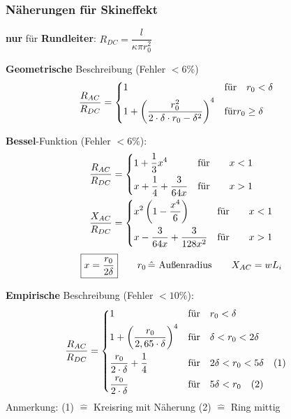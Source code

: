 \subsubsection{Näherungen für Skineffekt}
\textbf{nur} für \textbf{Rundleiter}: $ R_{DC} = \dfrac{l}{\kappa \pi r_0^2}$
\begin{description}
	\item \textbf{Geometrische} Beschreibung (Fehler $ < 6\% $)
	  	\begin{align*}
		\frac{R_{AC}}{R_{DC}} & =
		\begin{dcases}
			1 & \text{für} \quad r_0 < \delta \\
			1+ \left( \frac{r_0^2}{2\cdot \delta \cdot r_0 - \delta^2} \right)^4  & \text{für} r_0 \geq \delta
		\end{dcases}
	\end{align*}
	
    \item \textbf{Bessel}-Funktion (Fehler $ < 6 \% $):
          \begin{align*}
              \frac{R_{AC}}{R_{DC}} & =
              \begin{dcases}
                  1 + \frac{1}{3}x^4              & \text{für} \qquad x < 1 \\
                  x + \frac{1}{4} + \frac{3}{64x} & \text{für} \qquad x > 1 \\
              \end{dcases} \\
              \frac{X_{AC}}{R_{DC}} & =
              \begin{dcases}
                  x^2\left( 1-\frac{x^4}{6} \right)   & \text{für} \qquad x < 1 \\
                  x- \frac{3}{64x} + \frac{3}{128x^2} & \text{für} \qquad x > 1 \\
              \end{dcases}
          \end{align*}
          \[
              \boxed{x=\frac{r_0}{2\delta}} \qquad r_0 \, \hat{=} \textnormal{ Außenradius} \qquad X_{AC} = wL_i
          \]
          
  	\item \textbf{Empirische} Beschreibung (Fehler $ < 10\% $):
  	\begin{align*}
  	\frac{R_{AC}}{R_{DC}} & =
  		\begin{dcases}
  			1               & \text{für} \quad r_0 < \delta \\
  			1+ \left( \frac{r_0}{2,65\cdot \delta} \right)^4  & \text{für} \quad \delta < r_0 < 2\delta \\
  			\frac{r_0}{2 \cdot\delta} + \frac{1}{4} & \text{für} \quad 2\delta < r_0 < 5\delta \quad (1) \\
  			\frac{r_0}{2\cdot \delta} & \text{für} \quad 5\delta < r_0 \quad (2)
  		\end{dcases}
  	\end{align*}
 \footnotesize Anmerkung: (1) $\widehat{=}$ Kreisring mit Näherung \quad (2) $\widehat{=}$ Ring mittig
\end{description}

